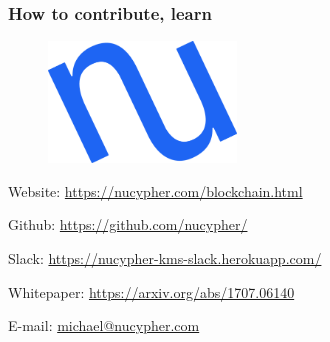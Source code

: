 \documentclass[xetex,mathsans,sans]{beamer}
\begin{document}
    \begin{frame}
        \frametitle{How to contribute, learn}
        \begin{figure}
            \centering
            \includegraphics[width=5cm]{pdf/nucypher_logo.pdf}
        \end{figure}
        Website: \url{https://nucypher.com/blockchain.html}

        Github: \url{https://github.com/nucypher/}

        Slack: \url{https://nucypher-kms-slack.herokuapp.com/}

        Whitepaper: \url{https://arxiv.org/abs/1707.06140}

        E-mail: \url{michael@nucypher.com}
    \end{frame}
\end{document}
